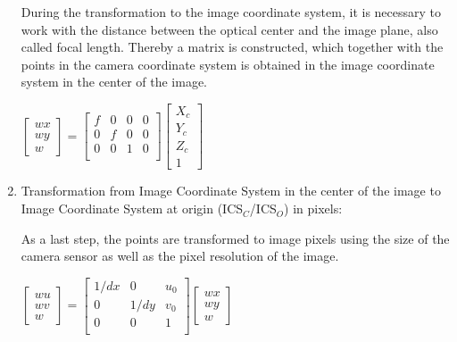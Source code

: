 \begin{enumerate}
	    During the transformation to the image coordinate system, it is necessary to work with the distance between the optical center and the image plane, also called focal length. Thereby a matrix is constructed, which together with the points in the camera coordinate system is obtained in the image coordinate system in the center of the image.
	
	    \begin{center}
		    $
		    \begin{bmatrix} wx \\ wy \\ w \end{bmatrix}
		    =
		    \begin{bmatrix}
			    f & 0 & 0 & 0 \\
			    0 & f & 0 & 0 \\
			    0 & 0 & 1 & 0 \\
			    \end{bmatrix}
		    \begin{bmatrix} X_c \\ Y_c \\ Z_c \\ 1 \end{bmatrix}
		    $
		    \end{center}
	    \item Transformation from Image Coordinate System in the center of the image to Image Coordinate System at origin (ICS$_C$/ICS$_O$) in pixels:
	    \par
	    \vspace{1mm}
	    As a last step, the points are transformed to image pixels using the size of the camera sensor as well as the pixel resolution of the image.
	
	    \begin{center}
		    $
		    \begin{bmatrix} wu \\ wv \\ w \end{bmatrix}
		    =
		    \begin{bmatrix}
			    1/dx & 0 & u_0 \\
			    0 & 1/dy & v_0 \\
			    0 & 0 & 1 \\
			    \end{bmatrix}
		    \begin{bmatrix} wx \\ wy \\ w \end{bmatrix}
		    $
		\end{center}
\end{enumerate}
	
